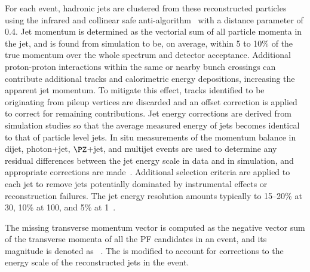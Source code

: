 \documentclass[11pt,a4paper,cmspaper,final,collab]{cms-tdr}
\begin{document}
For each event, hadronic jets are clustered from these reconstructed particles using the infrared and collinear safe anti-\kt algorithm~\cite{Cacciari:2008gp, Cacciari:2011ma} with a distance parameter of 0.4. Jet momentum is determined as the vectorial sum of all particle momenta in the jet, and is found from simulation to be, on average, within 5 to 10\% of the true momentum over the whole \pt spectrum and detector acceptance. Additional proton-proton interactions within the same or nearby bunch crossings can contribute additional tracks and calorimetric energy depositions, increasing the apparent jet momentum. To mitigate this effect, tracks identified to be originating from pileup vertices are discarded and an offset correction is applied to correct for remaining contributions. Jet energy corrections are derived from simulation studies so that the average measured energy of jets becomes identical to that of particle level jets. In situ measurements of the momentum balance in dijet, photon+jet, $\PZ$+jet, and multijet events are used to determine any residual differences between the jet energy scale in data and in simulation, and appropriate corrections are made~\cite{Khachatryan:2016kdb}. Additional selection criteria are applied to each jet to remove jets potentially dominated by instrumental effects or reconstruction failures. The jet energy resolution amounts typically to 15--20\% at 30\GeV, 10\% at 100\GeV, and 5\% at 1\TeV~\cite{Khachatryan:2016kdb}.


The missing transverse momentum vector \ptvecmiss is computed as the negative vector sum 
of the transverse momenta of all the PF candidates in an event, 
and its magnitude is denoted as \ptmiss~\cite{METperformance}. 
The \ptvecmiss is modified to account for corrections to the energy scale of the reconstructed jets in the event.
\end{document}
